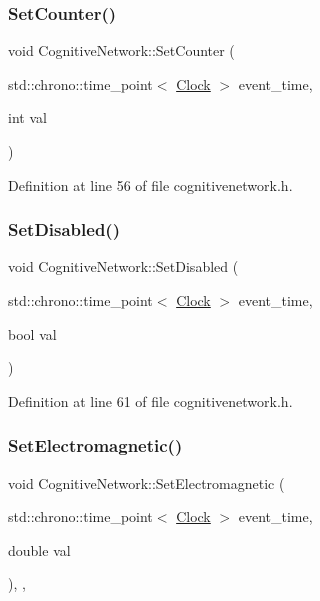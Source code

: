 \subsubsection{\texorpdfstring{Set\+Counter()}{SetCounter()}}
{\footnotesize\ttfamily void Cognitive\+Network\+::\+Set\+Counter (\begin{DoxyParamCaption}\item[{std\+::chrono\+::time\+\_\+point$<$ \hyperlink{universe_8h_a0ef8d951d1ca5ab3cfaf7ab4c7a6fd80}{Clock} $>$}]{event\+\_\+time,  }\item[{int}]{val }\end{DoxyParamCaption})\hspace{0.3cm}{\ttfamily [inline]}}



Definition at line 56 of file cognitivenetwork.\+h.

\mbox{\label{class_cognitive_network_ac29e676c84244f5b64c0083a0efead28}} 
\subsubsection{\texorpdfstring{Set\+Disabled()}{SetDisabled()}}
{\footnotesize\ttfamily void Cognitive\+Network\+::\+Set\+Disabled (\begin{DoxyParamCaption}\item[{std\+::chrono\+::time\+\_\+point$<$ \hyperlink{universe_8h_a0ef8d951d1ca5ab3cfaf7ab4c7a6fd80}{Clock} $>$}]{event\+\_\+time,  }\item[{bool}]{val }\end{DoxyParamCaption})\hspace{0.3cm}{\ttfamily [inline]}}



Definition at line 61 of file cognitivenetwork.\+h.

\mbox{\label{class_cognitive_network_a31764cd5746369d16b45f2ff74806a0b}} 
\subsubsection{\texorpdfstring{Set\+Electromagnetic()}{SetElectromagnetic()}}
{\footnotesize\ttfamily void Cognitive\+Network\+::\+Set\+Electromagnetic (\begin{DoxyParamCaption}\item[{std\+::chrono\+::time\+\_\+point$<$ \hyperlink{universe_8h_a0ef8d951d1ca5ab3cfaf7ab4c7a6fd80}{Clock} $>$}]{event\+\_\+time,  }\item[{double}]{val }\end{DoxyParamCaption})\hspace{0.3cm}{\ttfamily [inline]}, {\ttfamily [final]}, {\ttfamily [virtual]}}



